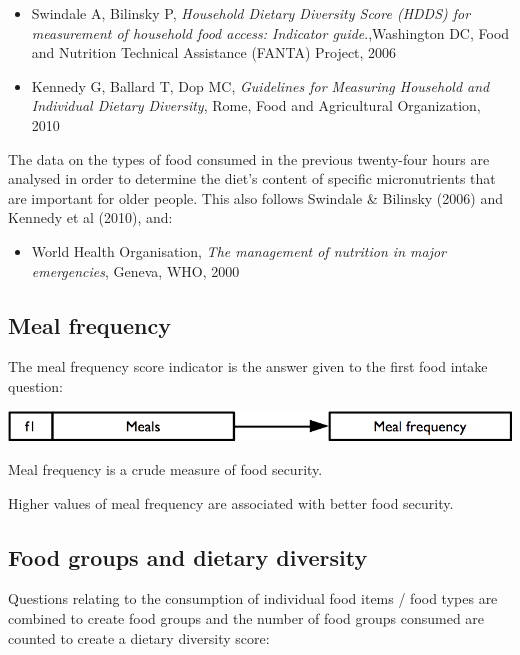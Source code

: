 \documentclass[12pt,a4paper]{book}
\providecommand{\tightlist}{%
  \setlength{\itemsep}{0pt}\setlength{\parskip}{0pt}}
\theoremstyle{definition}
\theoremstyle{definition}
\theoremstyle{definition}
\theoremstyle{remark}
\begin{document}
\begin{itemize}
\item
  Swindale A, Bilinsky P, \emph{Household Dietary Diversity Score (HDDS)
  for measurement of household food access: Indicator guide}.,Washington
  DC, Food and Nutrition Technical Assistance (FANTA) Project, 2006
\item
  Kennedy G, Ballard T, Dop MC, \emph{Guidelines for Measuring Household
  and Individual Dietary Diversity}, Rome, Food and Agricultural
  Organization, 2010
\end{itemize}

The data on the types of food consumed in the previous twenty-four hours
are analysed in order to determine the diet's content of specific
micronutrients that are important for older people. This also follows
Swindale \& Bilinsky (2006) and Kennedy et al (2010), and:

\begin{itemize}
\tightlist
\item
  World Health Organisation, \emph{The management of nutrition in major
  emergencies}, Geneva, WHO, 2000
\end{itemize}

\hypertarget{meal-frequency}{%
\subsection{Meal frequency}\label{meal-frequency}}

The meal frequency score indicator is the answer given to the first food
intake question:

\begin{center}\includegraphics{figures/indicators05} \end{center}

Meal frequency is a crude measure of food security.

Higher values of meal frequency are associated with better food
security.

\hypertarget{food-groups-and-dietary-diversity}{%
\subsection{Food groups and dietary
diversity}\label{food-groups-and-dietary-diversity}}

Questions relating to the consumption of individual food items / food
types are combined to create food groups and the number of food groups
consumed are counted to create a dietary diversity score:
\end{document}
